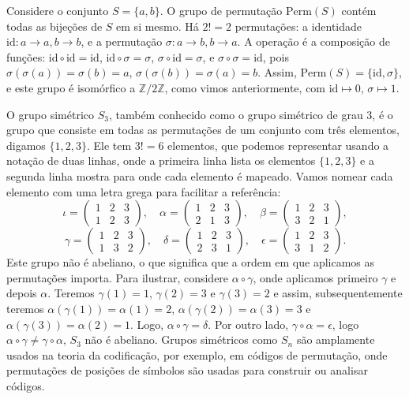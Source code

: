 \begin{example}
  Considere o conjunto $S = \{a, b\}$. O grupo de permutação
  $\text{Perm}(S)$ contém todas as bijeções de $S$ em si mesmo. 
  Há $2! = 2$ permutações: a identidade $\text{id}: a \to a, b \to b$, e a
  permutação $\sigma: a \to b, b \to a$. A operação é a composição de
  funções: $\text{id} \circ \text{id} = \text{id}$,
  $\text{id} \circ \sigma = \sigma$, $\sigma \circ \text{id} = \sigma$, e
  $\sigma \circ \sigma = \text{id}$, pois $\sigma(\sigma(a)) = \sigma(b) = a$,
  $\sigma(\sigma(b)) = \sigma(a) = b$. Assim, $\text{Perm}(S) = \{ \text{id}, \sigma \}$,
  e este grupo é isomórfico a $\mathbb{Z}/2\mathbb{Z}$, 
  como vimos anteriormente, com $\text{id} \mapsto  0$, $\sigma \mapsto 1$.
\end{example}


\begin{example}
  O grupo simétrico $S_3$, também conhecido como o grupo simétrico de grau 3,
  é o grupo que consiste em todas as permutações de um conjunto com três
  elementos, digamos $\{1, 2, 3\}$. Ele tem $3! = 6$ elementos, que
  podemos representar usando a notação de duas linhas, onde a primeira linha
  lista os elementos $\{1, 2, 3\}$ e a segunda linha mostra para onde cada
  elemento é mapeado. Vamos nomear cada elemento com uma letra grega para
  facilitar a referência:
\[
\iota = \begin{pmatrix} 1 & 2 & 3 \\ 1 & 2 & 3 \end{pmatrix}, \quad
\alpha = \begin{pmatrix} 1 & 2 & 3 \\ 2 & 1 & 3 \end{pmatrix}, \quad
\beta = \begin{pmatrix} 1 & 2 & 3 \\ 3 & 2 & 1 \end{pmatrix},
\]
\[
\gamma = \begin{pmatrix} 1 & 2 & 3 \\ 1 & 3 & 2 \end{pmatrix}, \quad
\delta = \begin{pmatrix} 1 & 2 & 3 \\ 2 & 3 & 1 \end{pmatrix}, \quad
\epsilon = \begin{pmatrix} 1 & 2 & 3 \\ 3 & 1 & 2 \end{pmatrix}.
\]
  Este grupo não é abeliano, o que significa que a ordem em que aplicamos as
  permutações importa. Para ilustrar, considere $\alpha \circ \gamma$,
  onde aplicamos primeiro $\gamma$ e depois $\alpha$. Teremos
  $\gamma(1) = 1$, $\gamma(2) = 3$ e $\gamma(3) = 2$ e assim, subsequentemente
  teremos $\alpha(\gamma(1)) = \alpha(1) = 2$, $\alpha(\gamma(2)) = \alpha(3) = 3$
  e $\alpha(\gamma(3)) = \alpha(2) = 1$. Logo, $\alpha \circ \gamma = \delta$.
  Por outro lado, $\gamma \circ \alpha = \epsilon$, logo 
  $\alpha \circ \gamma \neq \gamma \circ \alpha$, $S_3$ não é
  abeliano. Grupos simétricos como $S_n$ são amplamente usados na teoria da
  codificação, por exemplo, em códigos de permutação, onde permutações de
  posições de símbolos são usadas para construir ou analisar códigos.
\end{example}


